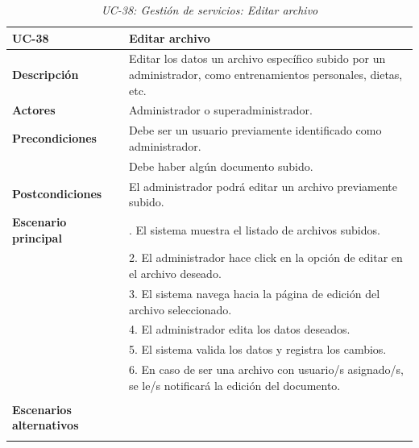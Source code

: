 \begin{table}
  \begin{center}
    \begin{tabularx}{16.4cm}{|l|X|}
      \hline
      \textbf{UC-38} & \textbf{Editar archivo}\\
      \hline
      \textbf{Descripción} & Editar los datos un archivo específico subido por un administrador, como entrenamientos personales, dietas, etc. \\
      \hline
      \textbf{Actores} & Administrador o superadministrador.\\
      \hline
      \textbf{Precondiciones} & Debe ser un usuario previamente identificado como administrador.\\
      & Debe haber algún documento subido.\\
      \hline
      \textbf{Postcondiciones} & El administrador podrá editar un archivo previamente subido.\\
      \hline
      \textbf{Escenario principal} & \smallskip 1. El sistema muestra el listado de archivos subidos.\\
      & 2. El administrador hace click en la opción de editar en el archivo deseado.\\
      & 3. El sistema navega hacia la página de edición del archivo seleccionado.\\
      & 4. El administrador edita los datos deseados.\\
      & 5. El sistema valida los datos y registra los cambios.\\
      & 6. En caso de ser una archivo con usuario/s asignado/s, se le/s notificará la edición del documento.\\
      & \\
      \hline
      \textbf{Escenarios alternativos} & \\
      & \\
      \hline
    \end{tabularx}
    \caption{\textit{UC-38: Gestión de servicios: Editar archivo}}
    \label{tab:CU-editar-archivo}
  \end{center}
\end{table}


